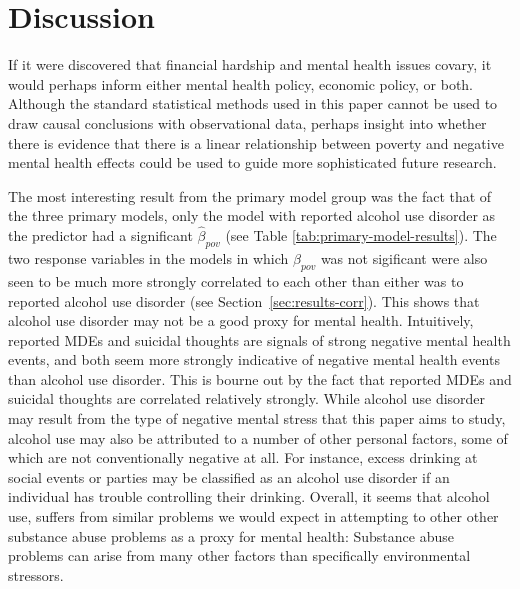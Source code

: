 \documentclass{article}
\begin{document}
\section{Discussion}


If it were discovered that financial hardship and mental
health issues covary, it would perhaps inform
either mental health policy, economic policy, or both.
Although the standard statistical methods used in this paper
cannot be used to draw causal conclusions with observational data,
perhaps insight into whether there is evidence that there
is a linear relationship between poverty and negative mental health effects
could be used to guide more sophisticated future research.

The most interesting result from the primary model group
was the fact that of the three primary models,
only the model with reported alcohol use disorder
as the predictor had a significant $\hat{\beta}_{pov}$
(see Table \ref{tab:primary-model-results}).
The two response variables in the models in which
$\hat{\beta}_{pov}$ was not sigificant were also
seen to be much more strongly correlated to each other
than either was to reported alcohol use disorder
(see Section~\ref{sec:results-corr}).
This shows that alcohol use disorder may not
be a good proxy for mental health.
Intuitively, reported MDEs and suicidal thoughts
are signals of strong negative mental health events,
and both seem more strongly indicative of negative mental health events
than alcohol use disorder.
This is bourne out by the fact that reported MDEs and suicidal thoughts
are correlated relatively strongly.
While alcohol use disorder may result from the type of negative
mental stress that this paper aims to study,
alcohol use may also be attributed to a number
of other personal factors, some of which are not conventionally
negative at all.
For instance, excess drinking at social events or parties
may be classified as an alcohol use disorder if
an individual has trouble controlling their drinking.
Overall, it seems that alcohol use,
suffers from similar problems we would expect in attempting
to other other substance abuse problems
as a proxy for mental health:
Substance abuse problems can arise from many other
factors than specifically environmental stressors.
\end{document}
